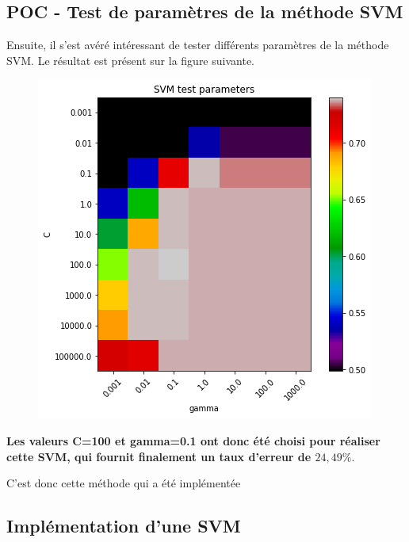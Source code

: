 \subsection{POC - Test de paramètres de la méthode SVM}

Ensuite, il s'est avéré intéressant de tester différents paramètres de la méthode SVM. Le résultat est présent sur la figure suivante.

\begin{figure}[!h]
\centering
\includegraphics{src/annexes/POC_FindStance_V2/output_24_0.png}
\end{figure}

\textbf{Les valeurs C=100 et gamma=0.1 ont donc été choisi pour réaliser cette SVM, qui fournit finalement un taux d'erreur de $24,49\%$}.

C'est donc cette méthode qui a été implémentée

\subsection{Implémentation d'une SVM}




